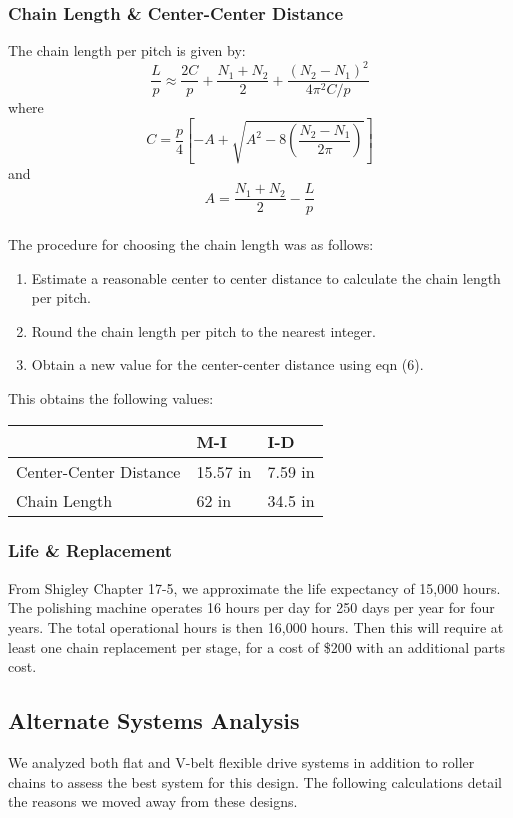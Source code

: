 \documentclass[letterpaper,12pt]{article}
\begin{document}
\subsubsection{Chain Length \& Center-Center Distance}
The chain length per pitch is given by:
\begin{equation}
\frac{L}{p} \approx \frac{2C}{p} + \frac{N_1 + N_2}{2} + \frac{(N_2 - N_1)^2}{4 \pi^2 C/p}
\end{equation}
where
\begin{equation}
    C = \frac{p}{4}\left[-A + \sqrt{A^2 - 8\left(\frac{N_2 - N_1}{2 \pi}\right)}\right]
\end{equation}
and
\begin{equation}
    A = \frac{N_1 + N_2}{2} - \frac{L}{p}
\end{equation}
\\
The procedure for choosing the chain length was as follows:
\begin{enumerate}
    \itemsep0em
    \item Estimate a reasonable center to center distance to calculate the chain length per pitch.
    \item Round the chain length per pitch to the nearest integer.
    \item Obtain a new value for the center-center distance using eqn (6).
\end{enumerate}
This obtains the following values:

\begin{center}
	\begin{tabular}{|p{4cm}|p{1.5cm}|p{1.5cm}| }
		\hline
		& M-I & I-D \\
		\hline
		Center-Center Distance & 15.57 in & 7.59 in\\
		Chain Length & 62 in & 34.5 in\\
		\hline
	\end{tabular}
\end{center}

\subsubsection{Life \& Replacement}
From Shigley Chapter 17-5, we approximate the life expectancy of 15,000 hours. The polishing machine operates 16 hours per day for 250 days per year for four years. The total operational hours is then 16,000 hours. Then this will require at least one chain replacement per stage, for a cost of \$200 with an additional parts cost.

\subsection{Alternate Systems Analysis}
We analyzed both flat and V-belt flexible drive systems in addition to roller chains to assess the best system for this design. The following calculations detail the reasons we moved away from these designs. 
\end{document}
